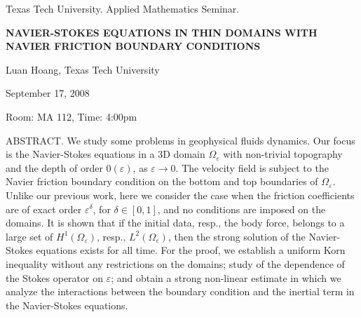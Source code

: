 \documentclass[twoside]{amsart}
\begin{document}
\begin{center}
Texas Tech University. Applied Mathematics Seminar.

\end{center}

\begin{center}

{\LARGE \uppercase{\textbf{Navier-Stokes equations in thin domains with Navier friction boundary conditions}}}

Luan Hoang, Texas Tech University

September 17, 2008

Room: MA 112, Time: 4:00pm

\end{center}


ABSTRACT.
We study some problems in geophysical fluids dynamics.
Our focus is the Navier-Stokes equations in a 3D domain $\Omega_\varepsilon$ with non-trivial topography and the depth of order $0(\varepsilon)$, as $\varepsilon\to 0$.
The velocity field is subject to the Navier friction boundary condition on the bottom and top boundaries of $\Omega_\varepsilon$.
Unlike our previous work, here we consider the case when the friction coefficients are of exact order $\varepsilon^\delta$, for $\delta\in[0,1]$, and no conditions are imposed on the domains.
It is shown that if the initial data, resp., the body force, belongs to a large set of $H^1(\Omega_\varepsilon)$, resp., $L^2(\Omega_\varepsilon)$, then the strong solution of the Navier-Stokes equations exists for all time.
For the proof, we establish a uniform Korn inequality without any restrictions on the domains; study of the dependence of the Stokes operator on $\varepsilon$;
and obtain a strong non-linear estimate in which we analyze the interactions between the boundary condition and the inertial term in the Navier-Stokes equations.
\end{document}
